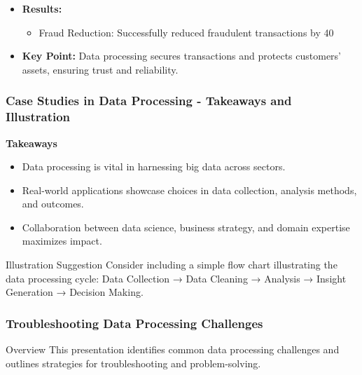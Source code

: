 \documentclass[aspectratio=169]{beamer}
\begin{document}
\begin{frame}[fragile]
\begin{itemize}
        \item \textbf{Results:}
        \begin{itemize}
            \item Fraud Reduction: Successfully reduced fraudulent transactions by 40%
        \end{itemize}
        
        \item \textbf{Key Point:}
        Data processing secures transactions and protects customers' assets, ensuring trust and reliability.
    \end{itemize}
\end{frame}

\begin{frame}[fragile]
    \frametitle{Case Studies in Data Processing - Takeaways and Illustration}
    
    \textbf{Takeaways}
    
    \begin{itemize}
        \item Data processing is vital in harnessing big data across sectors.
        \item Real-world applications showcase choices in data collection, analysis methods, and outcomes.
        \item Collaboration between data science, business strategy, and domain expertise maximizes impact.
    \end{itemize}
    
    \begin{block}{Illustration Suggestion}
        Consider including a simple flow chart illustrating the data processing cycle:
        Data Collection → Data Cleaning → Analysis → Insight Generation → Decision Making.
    \end{block}
    
\end{frame}

\begin{frame}
  \frametitle{Troubleshooting Data Processing Challenges}
  \begin{block}{Overview}
    This presentation identifies common data processing challenges and outlines strategies for troubleshooting and problem-solving.
  \end{block}
\end{frame}
\end{document}

